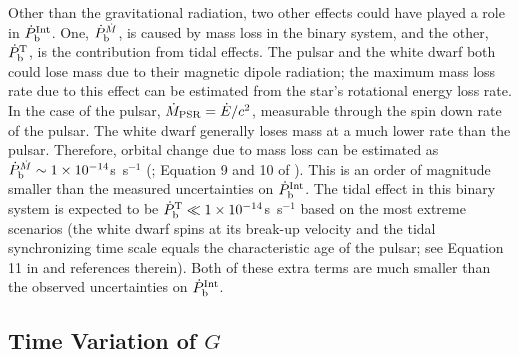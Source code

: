 Other than the gravitational radiation, two other effects could have played a role in
$\dot{P}_{\rm b}^{\rm Int}$. One, $\dot{P}_{\rm b}^{\dot{M}}$, is caused by mass loss in the
binary system, and the other, $\dot{P}_{\rm b}^{\rm T}$, is the contribution
from tidal effects.
The pulsar and the white dwarf both could lose mass due to their magnetic dipole radiation; the maximum
mass loss rate due to this effect can be estimated from the
star's rotational energy loss rate. In the case of the pulsar, $\dot{M}_{\rm
PSR}=\dot{E}/c^2$, measurable through the spin down rate of the pulsar.
The white dwarf generally loses mass at a much lower rate than the pulsar.
Therefore, orbital change due to mass loss can be estimated as $\dot{P}_{\rm
b}^{\dot{M}}\sim 1\times10^{-14}$s~s$^{-1}$ (\citealt{dt91}; Equation 9 and 10
of \citealt{fwe+12}). This is an order of magnitude smaller than the measured
uncertainties on $\dot{P}_{\rm b}^{\rm Int}$.
The tidal effect in this binary system is expected to be $\dot{P}_{\rm b}^{\rm
T}\ll1\times10^{-14}$s~s$^{-1}$ based on the most extreme scenarios (the white
dwarf spins at its break-up velocity and the tidal synchronizing time scale equals the
characteristic age of the pulsar; see Equation 11 in \citealt{fwe+12} and
references therein).
Both of these extra terms are much smaller than the observed uncertainties
on $\dot{P}_{\rm b}^{\rm Int}$.


\subsection{Time Variation of $G$}
\label{sec:Gdot}


